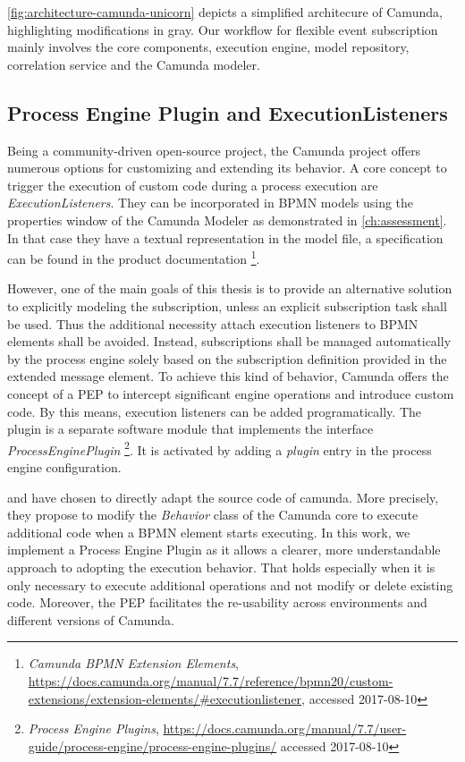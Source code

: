 \autoref{fig:architecture-camunda-unicorn} depicts a simplified architecure of Camunda, highlighting modifications in gray.
Our workflow for flexible event subscription mainly involves the core components, execution engine, model repository, correlation service and the Camunda modeler.

\subsection{Process Engine Plugin and ExecutionListeners}
Being a community-driven open-source project, the Camunda project offers numerous options for customizing and extending its behavior.
A core concept to trigger the execution of custom code during a process execution are \textit{ExecutionListeners}.
They can be incorporated in BPMN models using the properties window of the Camunda Modeler as demonstrated in \autoref{ch:assessment}. In that case they have a textual representation in the model file, a specification can be found in the product documentation
\footnote{\textit{Camunda BPMN Extension Elements}, \url{https://docs.camunda.org/manual/7.7/reference/bpmn20/custom-extensions/extension-elements/\#executionlistener}, accessed 2017-08-10}.

However, one of the main goals of this thesis is to provide an alternative solution to explicitly modeling the subscription, unless an explicit subscription task shall be used. Thus the additional necessity attach execution listeners to BPMN elements shall be avoided.
Instead, subscriptions shall be managed automatically by the process engine solely based on the subscription definition provided in the extended message element.
To achieve this kind of behavior, Camunda offers the concept of a \ac{PEP} to intercept significant engine operations and introduce custom code. 
By this means, execution listeners can be added programatically.
The plugin is a separate software module that implements the interface \textit{ProcessEnginePlugin}
\footnote{\textit{Process Engine Plugins}, \url{https://docs.camunda.org/manual/7.7/user-guide/process-engine/process-engine-plugins/} accessed 2017-08-10}.
It is activated by adding a \textit{plugin} entry in the process engine configuration.

\cite{mandal:2017} and \cite{Pufahl2017} have chosen to directly adapt the source code of camunda. More precisely, they propose to modify the \textit{Behavior} class of the Camunda core to execute additional code when a BPMN element starts executing.
In this work, we implement a Process Engine Plugin as it allows a clearer, more understandable approach to adopting the execution behavior. 
That holds especially when it is only necessary to execute additional operations and not modify or delete existing code.
Moreover, the PEP facilitates the re-usability across environments and different versions of Camunda.

